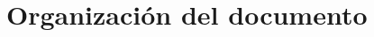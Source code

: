 \section{Organizaci\'on del documento}
\label{intro:organizacion}
\begin{comment}
Contar con este grupo de académicos con grado de doctor permitió alcanzar una masa crítica que, junto con los resultados exitosos del Magíster en Ingeniería Informática, motivó al Departamento a trabajar en la elaboración del Programa de Doctorado en Ciencias de la Ingeniería mención Informática. Este programa fue creado por Resolución 6104 del 2000. Ese mismo año el Departamento organizó con éxito las Jornadas Chilenas de Computación, punto de reunión de los académicos nacionales y de los alumnos de Informática del país y que contó además con la participación de destacados investigadores de orden mundial.
\end{comment}
